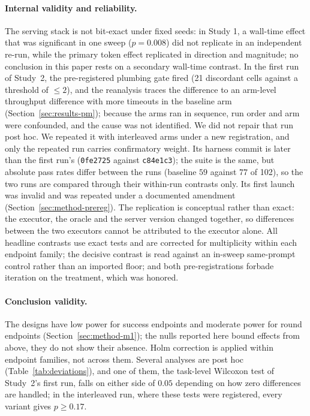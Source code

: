 \documentclass[smallcondensed,natbib]{svjour3}
\begin{document}
\paragraph{Internal validity and reliability.} The serving stack is
not bit-exact under fixed seeds: in Study 1, a wall-time effect that
was significant in one sweep ($p=0.008$) did not replicate in an
independent re-run, while the primary token effect replicated in
direction and magnitude; no conclusion in this paper rests on a
secondary wall-time contrast. In the first run of Study~2, the
pre-registered plumbing gate fired (21 discordant cells against a
threshold of $\leq 2$), and the reanalysis traces the difference to an
arm-level throughput difference with more timeouts in the baseline arm
(Section~\ref{sec:results-pm}); because the arms ran in sequence, run
order and arm were confounded, and the cause was not identified. We
did not repair that run post hoc. We repeated it with interleaved arms
under a new registration, and only the repeated run carries
confirmatory weight. Its harness commit is later than the first run's
(\texttt{0fe2725} against \texttt{c84e1c3}); the suite is the same, but
absolute pass rates differ between the runs (baseline $59$ against
$77$ of 102), so the two runs are compared through their within-run
contrasts only. Its first launch was invalid and was repeated under a
documented amendment (Section~\ref{sec:method-prereg}). The
replication is conceptual rather than exact: the executor, the oracle
and the server version changed together, so differences between the
two executors cannot be attributed to the executor alone. All
headline contrasts use exact tests and are corrected for multiplicity
within each endpoint family; the decisive contrast is read against an
in-sweep same-prompt control rather than an imported floor; and both
pre-registrations forbade iteration on the treatment, which was
honored.

\paragraph{Conclusion validity.} The designs have low power for
success endpoints and moderate power for round endpoints
(Section~\ref{sec:method-m1}); the nulls reported here bound effects
from above, they do not show their absence. Holm correction is applied
within endpoint families, not across them. Several analyses are post
hoc (Table~\ref{tab:deviations}), and one of them, the task-level
Wilcoxon test of Study~2's first run, falls on either side of $0.05$
depending on how zero differences are handled; in the interleaved run,
where these tests were registered, every variant gives $p\geq0.17$.
\end{document}
